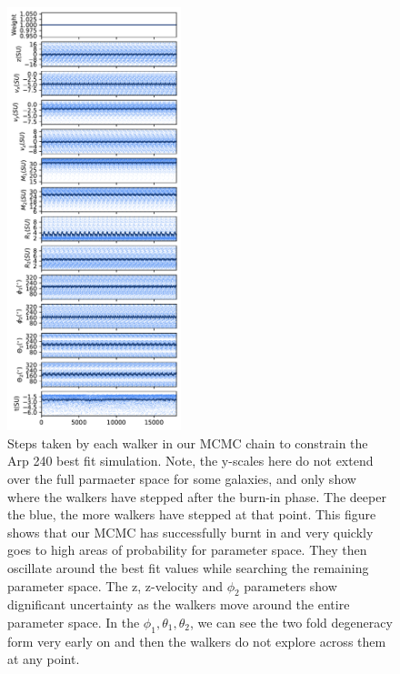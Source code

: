 \begin{figure}
    \centering
    \includegraphics[width=0.45\textwidth]{Chapter1/figures/arp-240-steps.pdf}
    \caption{Steps taken by each walker in our MCMC chain to constrain the Arp 240 best fit simulation. Note, the y-scales here do not extend over the full parmaeter space for some galaxies, and only show where the walkers have stepped after the burn-in phase. The deeper the blue, the more walkers have stepped at that point. This figure shows that our MCMC has successfully burnt in and very quickly goes to high areas of probability for parameter space. They then oscillate around the best fit values while searching the remaining parameter space. The z, z-velocity and $\phi_{2}$ parameters show dignificant uncertainty as the walkers move around the entire parameter space. In the $\phi_{1}, \theta_{1}, \theta_{2}$, we can see the two fold degeneracy form very early on and then the walkers do not explore across them at any point.}
    \label{fig:walker_steps}
\end{figure}

